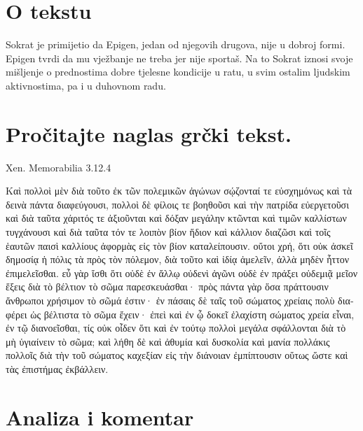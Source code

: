 


\section*{O tekstu}

Sokrat je primijetio da Epigen, jedan od njegovih drugova, nije u dobroj formi. Epigen tvrdi da mu vježbanje ne treba jer nije sportaš. Na to Sokrat iznosi svoje mišljenje o prednostima dobre tjelesne kondicije u ratu, u svim ostalim ljudskim aktivnostima, pa i u duhovnom radu.


\section*{Pročitajte naglas grčki tekst.}
Xen. Memorabilia 3.12.4

\medskip

{\large
\begin{greek}

\noindent Καὶ πολλοὶ μὲν διὰ τοῦτο ἐκ τῶν πολεμικῶν ἀγώνων σῴζονταί τε εὐσχημόνως καὶ τὰ δεινὰ πάντα διαφεύγουσι, πολλοὶ δὲ φίλοις τε βοηθοῦσι καὶ τὴν πατρίδα εὐεργετοῦσι καὶ διὰ ταῦτα χάριτός τε ἀξιοῦνται καὶ δόξαν μεγάλην κτῶνται καὶ τιμῶν καλλίστων τυγχάνουσι καὶ διὰ ταῦτα τόν τε λοιπὸν βίον ἥδιον καὶ κάλλιον διαζῶσι καὶ τοῖς ἑαυτῶν παισὶ καλλίους ἀφορμὰς εἰς τὸν βίον καταλείπουσιν. οὔτοι χρή, ὅτι οὐκ ἀσκεῖ δημοσίᾳ ἡ πόλις τὰ πρὸς τὸν πόλεμον, διὰ τοῦτο καὶ ἰδίᾳ ἀμελεῖν, ἀλλὰ μηδὲν ἧττον ἐπιμελεῖσθαι. εὖ γὰρ ἴσθι ὅτι οὐδὲ ἐν ἄλλῳ οὐδενὶ ἀγῶνι οὐδὲ ἐν πράξει οὐδεμιᾷ μεῖον ἕξεις διὰ τὸ βέλτιον τὸ σῶμα παρεσκευάσθαι· πρὸς πάντα γὰρ ὅσα πράττουσιν ἄνθρωποι χρήσιμον τὸ σῶμά ἐστιν· ἐν πάσαις δὲ ταῖς τοῦ σώματος χρείαις πολὺ διαφέρει ὡς βέλτιστα τὸ σῶμα ἔχειν· ἐπεὶ καὶ ἐν ᾧ δοκεῖ ἐλαχίστη σώματος χρεία εἶναι, ἐν τῷ διανοεῖσθαι, τίς οὐκ οἶδεν ὅτι καὶ ἐν τούτῳ πολλοὶ μεγάλα σφάλλονται διὰ τὸ μὴ ὑγιαίνειν τὸ σῶμα; καὶ λήθη δὲ καὶ ἀθυμία καὶ δυσκολία καὶ μανία πολλάκις πολλοῖς διὰ τὴν τοῦ σώματος καχεξίαν εἰς τὴν διάνοιαν ἐμπίπτουσιν οὕτως ὥστε καὶ τὰς ἐπιστήμας ἐκβάλλειν.

\end{greek}

}

\section*{Analiza i komentar}


